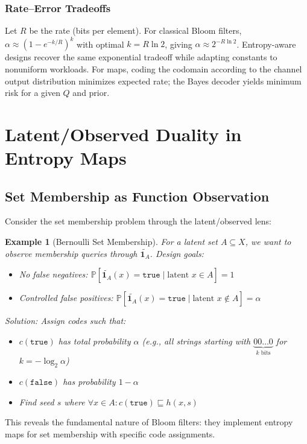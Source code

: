 \documentclass[11pt,final,hidelinks]{article}
\newtheorem{example}[theorem]{Example}
\newcommand{\obs}[1]{\widetilde{#1}}  %
\newcommand{\Indicator}[1]{\mathbf{1}_{#1}}
\newcommand{\ProbCond}[2]{\mathbb{P}\left[#1 \mid #2\right]}
\newcommand{\fprate}{\alpha}
\newcommand{\True}{\mathtt{true}}
\newcommand{\False}{\mathtt{false}}
\begin{document}
\subsubsection{Rate–Error Tradeoffs}
Let $R$ be the rate (bits per element). For classical Bloom filters, $\fprate \approx (1-e^{-k/R})^k$ with optimal $k=R\ln 2$, giving $\fprate\approx 2^{-R\ln 2}$. Entropy-aware designs recover the same exponential tradeoff while adapting constants to nonuniform workloads. For maps, coding the codomain according to the channel output distribution minimizes expected rate; the Bayes decoder yields minimum risk for a given $Q$ and prior.

\section{Latent/Observed Duality in Entropy Maps}

\subsection{Set Membership as Function Observation}

Consider the set membership problem through the latent/observed lens:

\begin{example}[Bernoulli Set Membership]
For a latent set $A \subseteq X$, we want to observe membership queries through $\obs{\Indicator{A}}$. Design goals:
\begin{itemize}
    \item No false negatives: $\ProbCond{\obs{\Indicator{A}}(x) = \True}{\text{latent } x \in A} = 1$
    \item Controlled false positives: $\ProbCond{\obs{\Indicator{A}}(x) = \True}{\text{latent } x \notin A} = \fprate$
\end{itemize}

Solution: Assign codes such that:
\begin{itemize}
    \item $c(\True)$ has total probability $\fprate$ (e.g., all strings starting with $\underbrace{00\ldots0}_{k \text{ bits}}$ for $k = -\log_2 \fprate$)
    \item $c(\False)$ has probability $1 - \fprate$
    \item Find seed $s$ where $\forall x \in A: c(\True) \sqsubseteq h(x, s)$
\end{itemize}
\end{example}

This reveals the fundamental nature of Bloom filters: they implement entropy maps for set membership with specific code assignments.
\end{document}
